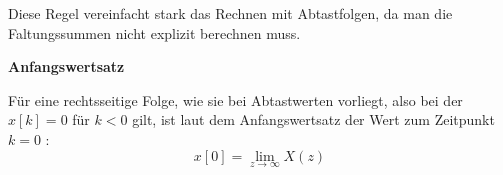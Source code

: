 Diese Regel vereinfacht stark das Rechnen mit Abtastfolgen, da man die Faltungssummen nicht explizit berechnen muss.


\addvspace{1cm}
\textbf{Anfangswertsatz}

Für eine rechtsseitige Folge, wie sie bei Abtastwerten vorliegt, also bei der $x[k] = 0$ für $k<0$ gilt, ist laut dem Anfangswertsatz der Wert zum Zeitpunkt $k=0$ :
\begin{equation}
    x[0] = \lim_{z \to \infty} X(z)
\end{equation}

\cite[S.215]{book3} \cite[S.239]{book2}